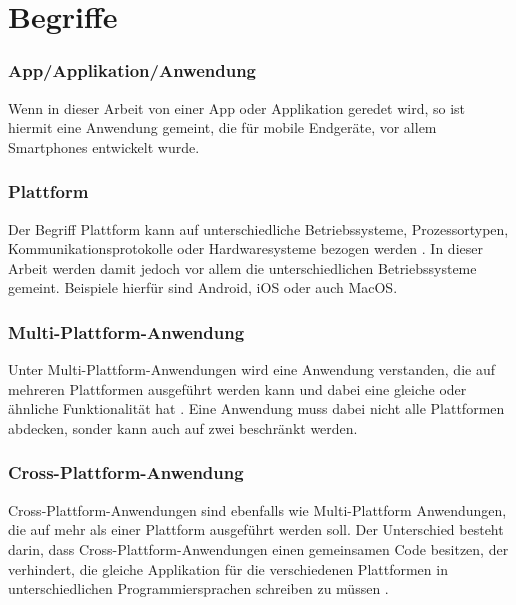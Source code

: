 \section{Begriffe}
\subsubsection{App/Applikation/Anwendung}
Wenn in dieser Arbeit von einer App oder Applikation geredet wird, so ist hiermit eine Anwendung gemeint, die für mobile Endgeräte, vor allem Smartphones entwickelt wurde.
\subsubsection{Plattform}
Der Begriff Plattform kann auf unterschiedliche Betriebssysteme, Prozessortypen, Kommunikationsprotokolle oder Hardwaresysteme bezogen werden \cite{2014Mulit_plattform_definition}. In dieser Arbeit werden damit jedoch vor allem die unterschiedlichen Betriebssysteme gemeint. Beispiele hierfür sind Android, iOS oder auch MacOS. 
\subsubsection{Multi-Plattform-Anwendung}
Unter Multi-Plattform-Anwendungen wird eine Anwendung verstanden, die auf mehreren Plattformen ausgeführt werden kann und dabei eine gleiche oder ähnliche Funktionalität hat \cite{2014Mulit_plattform_definition}. Eine Anwendung muss dabei nicht alle Plattformen abdecken, sonder kann auch auf zwei beschränkt werden.
\subsubsection{Cross-Plattform-Anwendung}
Cross-Plattform-Anwendungen sind ebenfalls wie Multi-Plattform Anwendungen, die auf mehr als einer Plattform ausgeführt werden soll. Der Unterschied besteht darin, dass Cross-Plattform-Anwendungen einen gemeinsamen Code besitzen, der verhindert, die gleiche Applikation für die verschiedenen Plattformen in unterschiedlichen Programmiersprachen schreiben zu müssen \cite{2014_Cross_plattform}.